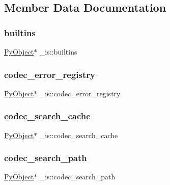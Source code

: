 \subsection{Member Data Documentation}
\mbox{\label{struct__is_aed5b927da76a3c44b320b5faf68db0f5}} 
\subsubsection{\texorpdfstring{builtins}{builtins}}
{\footnotesize\ttfamily \mbox{\hyperlink{_python27_2object_8h_aadc84ac7aed2cfa6f20c25f62bf3dac7}{Py\+Object}}$\ast$ \+\_\+is\+::builtins}

\mbox{\label{struct__is_a98cfa3eae066203fcfc5b884914d6daf}} 
\subsubsection{\texorpdfstring{codec\_error\_registry}{codec\_error\_registry}}
{\footnotesize\ttfamily \mbox{\hyperlink{_python27_2object_8h_aadc84ac7aed2cfa6f20c25f62bf3dac7}{Py\+Object}}$\ast$ \+\_\+is\+::codec\+\_\+error\+\_\+registry}

\mbox{\label{struct__is_aa85c05fed3a236e56918fe0c832c3c98}} 
\subsubsection{\texorpdfstring{codec\_search\_cache}{codec\_search\_cache}}
{\footnotesize\ttfamily \mbox{\hyperlink{_python27_2object_8h_aadc84ac7aed2cfa6f20c25f62bf3dac7}{Py\+Object}}$\ast$ \+\_\+is\+::codec\+\_\+search\+\_\+cache}

\mbox{\label{struct__is_ac1d3848054d54f616334ffc47b560fad}} 
\subsubsection{\texorpdfstring{codec\_search\_path}{codec\_search\_path}}
{\footnotesize\ttfamily \mbox{\hyperlink{_python27_2object_8h_aadc84ac7aed2cfa6f20c25f62bf3dac7}{Py\+Object}}$\ast$ \+\_\+is\+::codec\+\_\+search\+\_\+path}

